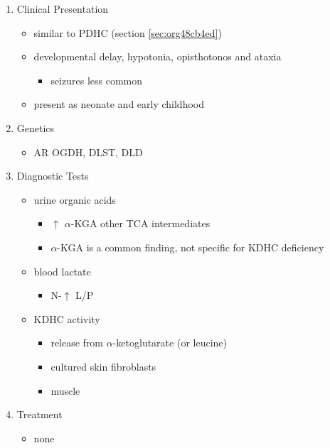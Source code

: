 \documentclass{scrartcl}
\begin{document}
\begin{enumerate}
\item Clinical Presentation
\label{sec:orgf1c5245}
\begin{itemize}
\item similar to PDHC (section \ref{sec:org48cb4ed})
\item developmental delay, hypotonia, opisthotonos and ataxia
\begin{itemize}
\item seizures less common
\end{itemize}
\item present as neonate and early childhood
\end{itemize}

\item Genetics
\label{sec:orgad17f94}
\begin{itemize}
\item AR OGDH, DLST, DLD
\end{itemize}

\item Diagnostic Tests
\label{sec:org22b0a43}
\begin{itemize}
\item urine organic acids
\begin{itemize}
\item \(\uparrow\) \(\alpha\)-KGA \textpm{} other TCA intermediates
\item \(\alpha\)-KGA is a common finding, not specific for KDHC deficiency
\end{itemize}
\item blood lactate
\begin{itemize}
\item N-\(\uparrow\) L/P
\end{itemize}
\item KDHC activity
\begin{itemize}
\item {} release from \ce{[1-^14C]} \(\alpha\)-ketoglutarate (or \ce{[1-^14C]} leucine)
\item cultured skin fibroblasts
\item muscle
\end{itemize}
\end{itemize}

\item Treatment
\label{sec:org5c09305}
\begin{itemize}
\item none
\end{itemize}
\end{enumerate}
\end{document}
